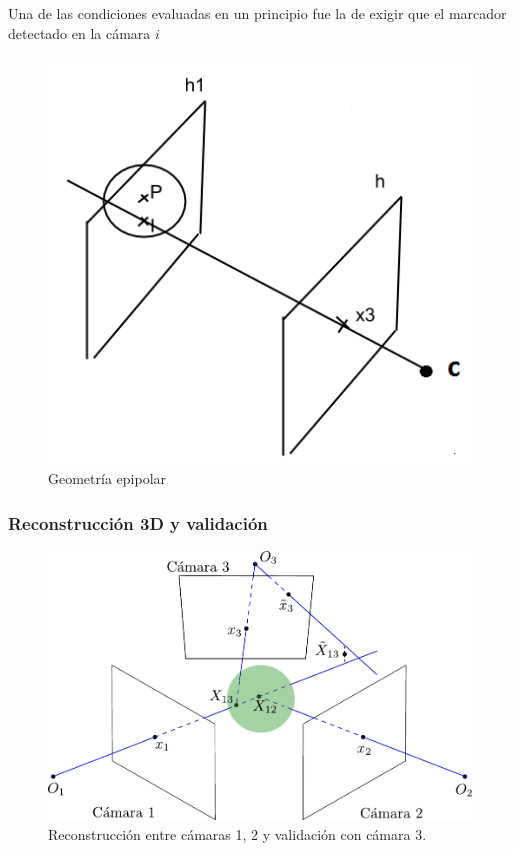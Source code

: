 Una de las condiciones evaluadas en un principio fue la de exigir que el marcador detectado en la cámara $i$

\begin{figure}[H]
\begin{center}
\includegraphics[scale=0.7]{img/Reconstruccion/validacion.png}
\end{center}
\caption{Geometría epipolar}
\label{fig: Etapa de validación}
\end{figure}

\subsubsection{Reconstrucción 3D y validación}

\begin{figure}[h!]
\centering
\includegraphics[scale=0.7]{img/Reconstruccion/validacion.pdf}
\caption{Reconstrucción entre cámaras 1, 2 y validación con cámara 3.}
\label{img_reconstruccion_validacion}
\end{figure}

